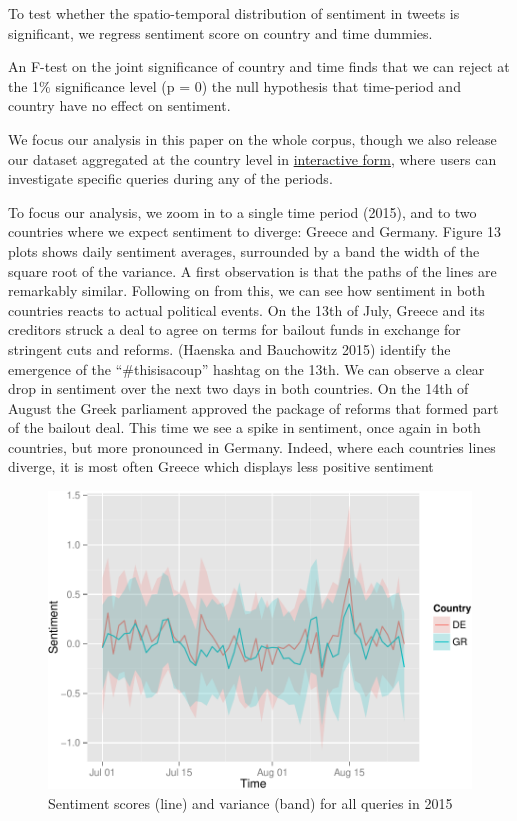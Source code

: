 \documentclass[]{article}
\begin{document}
To test whether the spatio-temporal distribution of sentiment in tweets
is significant, we regress sentiment score on country and time dummies.

An F-test on the joint significance of country and time finds that we
can reject at the 1\% significance level (p = 0) the null hypothesis
that time-period and country have no effect on sentiment.

We focus our analysis in this paper on the whole corpus, though we also
release our dataset aggregated at the country level in
\href{http://mcallaghan.github.io/col_res_proj/}{interactive form},
where users can investigate specific queries during any of the periods.

To focus our analysis, we zoom in to a single time period (2015), and to
two countries where we expect sentiment to diverge: Greece and Germany.
Figure 13 plots shows daily sentiment averages, surrounded by a band the
width of the square root of the variance. A first observation is that
the paths of the lines are remarkably similar. Following on from this,
we can see how sentiment in both countries reacts to actual political
events. On the 13th of July, Greece and its creditors struck a deal to
agree on terms for bailout funds in exchange for stringent cuts and
reforms. (Haenska and Bauchowitz 2015) identify the emergence of the
``\#thisisacoup'' hashtag on the 13th. We can observe a clear drop in
sentiment over the next two days in both countries. On the 14th of
August the Greek parliament approved the package of reforms that formed
part of the bailout deal. This time we see a spike in sentiment, once
again in both countries, but more pronounced in Germany. Indeed, where
each countries lines diverge, it is most often Greece which displays
less positive sentiment

\begin{figure}[htbp]
\centering
\includegraphics{fin_paper_files/figure-latex/unnamed-chunk-17-1.pdf}
\caption{Sentiment scores (line) and variance (band) for all queries in
2015}
\end{figure}
\end{document}
